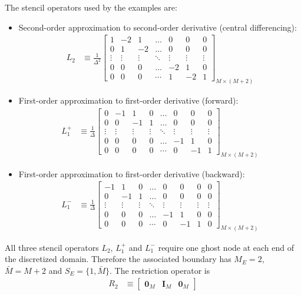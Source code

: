 \documentclass[11pt]{article}
\begin{document}
The stencil operators used by the examples are:
\begin{itemize}
\item Second-order approximation to second-order derivative (central differencing):
\begin{align}
	L_2 &\equiv \frac{1}{\Delta^2}\begin{bmatrix}
	1&-2&1&\dots&0&0&0\\
	0&1&-2&\dots&0&0&0\\
	\vdots&\vdots&\vdots&\ddots&\vdots&\vdots&\vdots\\
	0&0&0&\dots&-2&1&0\\
	0&0&0&\cdots&1&-2&1
	\end{bmatrix}_{M\times(M+2)}\label{eq:L-2}
\end{align}
\item First-order approximation to first-order derivative (forward):
\begin{align}
	L^{+}_1 &\equiv \frac{1}{\Delta}\begin{bmatrix}
	0&-1&1&0&\dots&0&0&0\\
	0&0&-1&1&\dots&0&0&0\\
	\vdots&\vdots&\vdots&\vdots&\ddots&\vdots&\vdots&\vdots\\
	0&0&0&0&\dots&-1&1&0\\
	0&0&0&0&\cdots&0&-1&1
	\end{bmatrix}_{M\times(M+2)}\label{eq:L-1p}
\end{align}
\item First-order approximation to first-order derivative (backward):
\begin{align}
	L^{-}_1 &\equiv \frac{1}{\Delta}\begin{bmatrix}
	-1&1&0&\dots&0&0&0&0\\
	0&-1&1&\dots&0&0&0&0\\
	\vdots&\vdots&\vdots&\ddots&\vdots&\vdots&\vdots&\vdots\\
	0&0&0&\dots&-1&1&0&0\\
	0&0&0&\cdots&0&-1&1&0
	\end{bmatrix}_{M\times(M+2)}\label{eq:L-1m}
\end{align}
\end{itemize}

All three stencil operators $L_2$, $L^{+}_1$ and $L^{-}_1$ require one ghost node at each end of the discretized domain. Therefore the associated boundary has $M_E = 2$, $\bar{M} = M + 2$ and $S_E = \{1,\bar{M}\}$. The restriction operator is
\begin{align}
	R_2 &\equiv \begin{bmatrix} \mathbf{0}_M & \mathbf{I}_M & \mathbf{0}_M\end{bmatrix}\label{eq:R-2}
\end{align}
\end{document}
